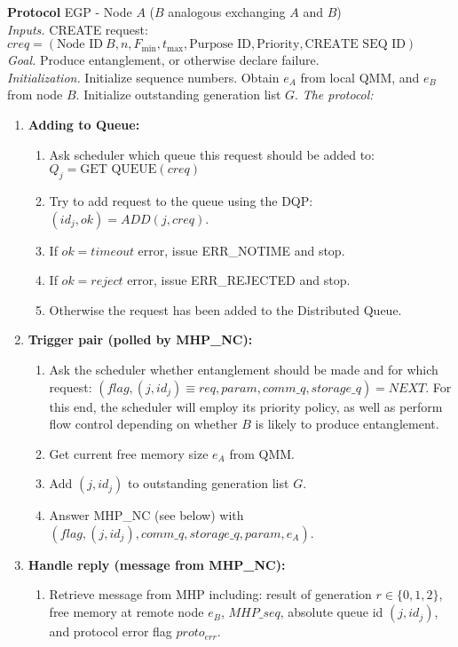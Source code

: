 \documentclass{article}
\makeatletter
\newcounter{Lprotocol}
\newenvironment{Lprotocol}[1]
  {\par\addvspace{\topsep}
   \noindent
   \tabularx{\linewidth}{@{} X @{}}
    \hline
    \refstepcounter{Lprotocol}\textbf{Protocol \theLprotocol} #1 \\
    \hline}
  { \\
    \hline
   \endtabularx
   \par\addvspace{\topsep}}
\newcommand{\sbline}{\\[.5\normalbaselineskip]}%
\makeatother
\begin{document}
\begin{Lprotocol}{EGP - Node $A$ ($B$ analogous exchanging $A$ and $B$)}
\textit{Inputs.} CREATE request: $creq = (\mbox{Node ID}\ B, n, F_{\min}, t_{\max}, \mbox{Purpose ID}, \mbox{Priority}, \mbox{CREATE SEQ ID})$
\sbline
\textit{Goal.} Produce entanglement, or otherwise declare failure.
\sbline
\textit{Initialization.} Initialize sequence numbers. Obtain $e_A$ from local QMM, and $e_B$ from node $B$. Initialize
outstanding generation list $G$.
\textit{The protocol:}
\begin{enumerate}
  \item \textbf{Adding to Queue:}
  \begin{enumerate}
    \item Ask scheduler which queue this request should be added to: $Q_j = \mbox{GET QUEUE}(creq)$
    \item Try to add request to the queue using the DQP: $(id_j, ok) = ADD(j, creq)$.
    \item If $ok = timeout$ error, issue ERR\_NOTIME and stop.
    \item If $ok = reject$ error, issue ERR\_REJECTED and stop.
    \item Otherwise the request has been added to the Distributed Queue.
   \end{enumerate}
  \item \textbf{Trigger pair (polled by MHP\_NC):}
  \begin{enumerate}
	\item Ask the scheduler whether entanglement should be made and for which request: $(flag, (j,id_j) \equiv req, param, comm\_q, storage\_q) = NEXT$. For this end, the scheduler will employ its priority policy, as well as perform flow control depending on whether $B$ is likely to produce entanglement.
	\item Get current free memory size $e_A$ from QMM.
	\item Add $(j,id_j)$ to outstanding generation list $G$.
	\item Answer  MHP\_NC (see below) with $(flag, (j,id_j), comm\_q, storage\_q, param, e_A)$.
   \end{enumerate}
   \item \textbf{Handle reply (message from MHP\_NC):}
   \begin{enumerate}
   \item Retrieve message from MHP including: result of generation $r \in \{0,1,2\}$, free memory at remote node $e_B$, $MHP\_seq$, absolute queue id $(j,id_j)$, and protocol error flag $proto_{err}$. 

\end{enumerate}
\end{enumerate}
\end{Lprotocol}
\end{document}
